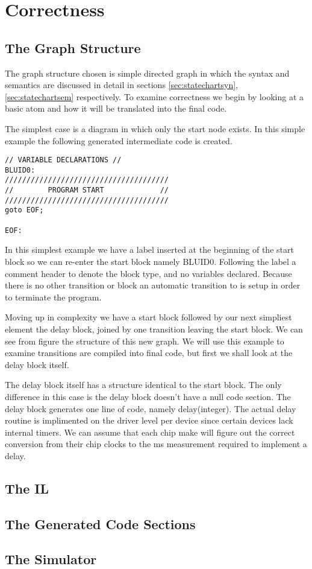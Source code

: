 \section{Correctness}
\subsection{The Graph Structure}
The graph structure chosen is simple directed graph in which the syntax and semantics are discussed in detail in sections \ref{sec:statechartsyn}, \ref{sec:statechartsem} respectively. To examine correctness we begin by looking at a basic atom and how it will be translated into the final code.

The simplest case is a diagram in which only the start node exists.
In this simple example the following generated intermediate code  is created.

\begin{lstlisting}
// VARIABLE DECLARATIONS //
BLUID0:
//////////////////////////////////////
//        PROGRAM START             //
//////////////////////////////////////
goto EOF;

EOF:
\end{lstlisting}

In this simplest example we have a label inserted at the beginning of the start block so we can re-enter the start block namely BLUID0. Following the label a comment header to denote the block type, and no variables declared.  Because there is no other transition or block an automatic transition to  is setup in order to terminate the program.

Moving up in complexity we have a start block followed by our next simpliest element the delay block, joined by one transition leaving the start block. We can see from figure %
the structure of this new graph. We will use this example to examine transitions are compiled into final code, but first we shall look at the delay block itself.

The delay block itself has a structure identical to the start block. The only difference in this case is the delay block doesn't have a null code section. The delay block generates one line of code, namely delay(integer). The actual delay routine is implimented on the driver level per device since certain devices lack internal timers. We can assume that each chip make will figure out the correct conversion from their chip clocks to the ms measurement required to implement a delay.


\subsection{The IL}
\subsection{The Generated Code Sections}
\subsection{The Simulator}